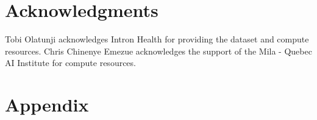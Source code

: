 \documentclass[11pt,a4paper]{article}
\begin{document}
\section*{Acknowledgments}
Tobi Olatunji acknowledges Intron Health for providing the dataset and compute resources. Chris Chinenye Emezue acknowledges the support of the Mila - Quebec AI Institute for compute resources. 







\appendix

\section{Appendix}




  
\end{document}
